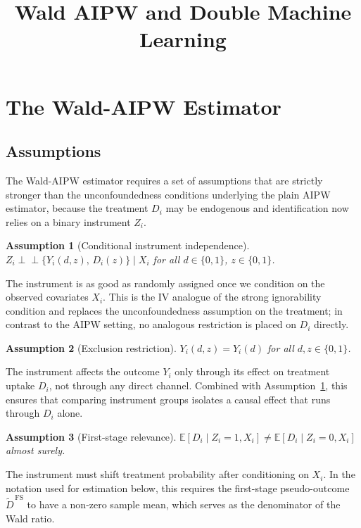 \documentclass[12pt,a4paper]{article}
\title{Wald AIPW and Double Machine Learning}
\author{}
\date{}
\newtheorem{assumption}{Assumption}
\newcommand{\E}{\mathbb{E}}
\begin{document}
\maketitle

\section{The Wald-AIPW Estimator}

\subsection{Assumptions}
\label{subsec:wald_aipw_assumptions}

The Wald-AIPW estimator requires a set of assumptions that are strictly stronger than the
unconfoundedness conditions underlying the plain AIPW estimator, because the treatment
$D_i$ may be endogenous and identification now relies on a binary instrument $Z_i$.

\begin{assumption}[Conditional instrument independence]
\label{ass:ci_independence}
$Z_i \perp\!\!\!\perp \{Y_i(d,z),\, D_i(z)\} \mid X_i$ for all $d \in \{0,1\}$, $z \in \{0,1\}$.
\end{assumption}

The instrument is as good as randomly assigned once we condition on the observed
covariates $X_i$. This is the IV analogue of the strong ignorability condition and replaces the
unconfoundedness assumption on the treatment; in contrast to the AIPW setting, no
analogous restriction is placed on $D_i$ directly.

\begin{assumption}[Exclusion restriction]
\label{ass:exclusion}
$Y_i(d,z) = Y_i(d)$ for all $d,z \in \{0,1\}$.
\end{assumption}

The instrument affects the outcome $Y_i$ only through its effect on treatment uptake $D_i$,
not through any direct channel. Combined with Assumption~\ref{ass:ci_independence}, this
ensures that comparing instrument groups isolates a causal effect that runs through $D_i$
alone.

\begin{assumption}[First-stage relevance]
\label{ass:relevance}
$\E[D_i \mid Z_i = 1, X_i] \neq \E[D_i \mid Z_i = 0, X_i]$ almost surely.
\end{assumption}

The instrument must shift treatment probability after conditioning on $X_i$. In the notation
used for estimation below, this requires the first-stage pseudo-outcome $\widetilde{D}^{\,\mathrm{FS}}$
to have a non-zero sample mean, which serves as the denominator of the Wald ratio.
\end{document}
